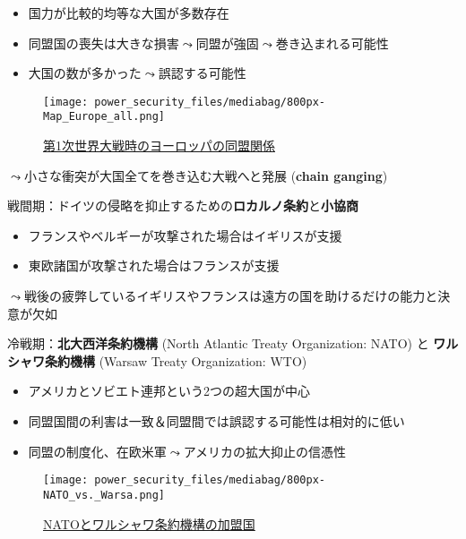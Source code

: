 \documentclass[
  xelatex,
  ja=standard]{bxjsarticle}
\providecommand{\tightlist}{%
  \setlength{\itemsep}{0pt}\setlength{\parskip}{0pt}}\usepackage{longtable,booktabs,array}
\begin{document}
\begin{itemize}
\tightlist
\item
  国力が比較的均等な大国が多数存在
\item
  同盟国の喪失は大きな損害\(\leadsto\)同盟が強固\(\leadsto\)巻き込まれる可能性
\item
  大国の数が多かった\(\leadsto\)誤認する可能性
\end{itemize}

\begin{figure}[htpb]

{\centering \texttt{[image: power\_security\_files/mediabag/800px-Map\_Europe\_all.png]}

}

\caption{\href{https://commons.wikimedia.org/wiki/File:Map_Europe_alliances_1914-en.svg}{第1次世界大戦時のヨーロッパの同盟関係}}

\end{figure}

\(\leadsto\)小さな衝突が大国全てを巻き込む大戦へと発展 (\textbf{chain
ganging})\citep{christensen1990}

戦間期：ドイツの侵略を抑止するための\textbf{ロカルノ条約}と\textbf{小協商}

\begin{itemize}
\tightlist
\item
  フランスやベルギーが攻撃された場合はイギリスが支援
\item
  東欧諸国が攻撃された場合はフランスが支援
\end{itemize}

\(\leadsto\)戦後の疲弊しているイギリスやフランスは遠方の国を助けるだけの能力と決意が欠如

冷戦期：\textbf{北大西洋条約機構} (North Atlantic Treaty Organization:
NATO) と \textbf{ワルシャワ条約機構} (Warsaw Treaty Organization: WTO)

\begin{itemize}
\tightlist
\item
  アメリカとソビエト連邦という2つの超大国が中心
\item
  同盟国間の利害は一致＆同盟間では誤認する可能性は相対的に低い
\item
  同盟の制度化、在欧米軍\(\leadsto\)アメリカの拡大抑止の信憑性
\end{itemize}

\begin{figure}[htpb]

{\centering \texttt{[image: power\_security\_files/mediabag/800px-NATO\_vs.\_Warsa.png]}

}

\caption{\href{https://commons.wikimedia.org/wiki/File:NATO_vs._Warsaw_(1949-1990).svg}{NATOとワルシャワ条約機構の加盟国}}

\end{figure}
\end{document}
